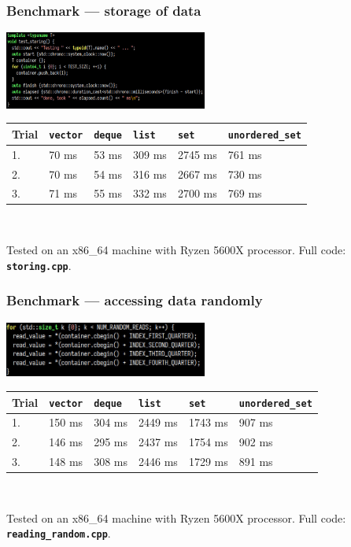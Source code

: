 \documentclass[aspectratio=169]{beamer}
\newcommand{\cpp}[1]{\texttt{\textbf{\textcolor{clCodeBlue}{#1}}}}
\newcommand\fontV{\fontsize{5}{5}\selectfont}
\newcommand\addsource[1]{\fontV\textcolor{clGray}{#1}}
\begin{document}
\begin{frame}
\frametitle{Benchmark --- storage of data}
\begin{center}
\includegraphics[width=0.5\textwidth]{pictures/code_storing.jpg} \\
\vspace*{16pt}
\begin{tabular}{|l|l|l|l|l|l|}
  \hline
  Trial & \cpp{vector} & \cpp{deque} & \cpp{list} & \cpp{set} & \cpp{unordered\_set} \\
  \hline
  1. & 70 ms & 53 ms & 309 ms & 2745 ms & 761 ms \\
  \hline
  2. & 70 ms & 54 ms & 316 ms & 2667 ms & 730 ms \\
  \hline
  3. & 71 ms & 55 ms & 332 ms & 2700 ms & 769 ms \\
  \hline
\end{tabular}\\
\end{center}
\vspace*{24pt}
\addsource{Tested on an x86\_64 machine with Ryzen 5600X processor. Full code: \cpp{storing.cpp}.}
\end{frame}

\begin{frame}
\frametitle{Benchmark --- accessing data randomly}
\begin{center}
\includegraphics[width=0.5\textwidth]{pictures/code_random_access.jpg}\\
\vspace*{16pt}
\begin{tabular}{|l|l|l|l|l|l|}
  \hline
  Trial & \cpp{vector} & \cpp{deque} & \cpp{list} & \cpp{set} & \cpp{unordered\_set} \\
  \hline
  1. & 150 ms & 304 ms & 2449 ms & 1743 ms & 907 ms \\
  \hline
  2. & 146 ms & 295 ms & 2437 ms & 1754 ms & 902 ms \\
  \hline
  3. & 148 ms & 308 ms & 2446 ms & 1729 ms & 891 ms \\
  \hline
\end{tabular}\\
\end{center}
\vspace*{24pt}
\addsource{Tested on an x86\_64 machine with Ryzen 5600X processor. Full code: \cpp{reading\_random.cpp}.}
\end{frame}
\end{document}
